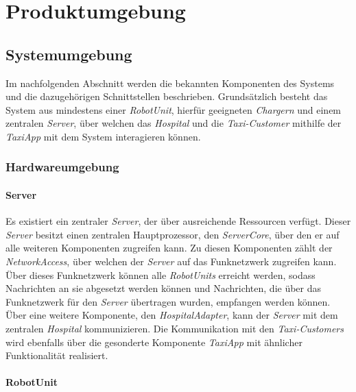 \section{Produktumgebung}

  \subsection{Systemumgebung}
  Im nachfolgenden Abschnitt werden die bekannten Komponenten des Systems und die dazugehörigen Schnittstellen beschrieben.
  Grundsätzlich besteht das System aus mindestens einer \emph{RobotUnit}, hierfür geeigneten \emph{Chargern} und einem zentralen \emph{Server}, über welchen das \emph{Hospital} und die \emph{Taxi-Customer} mithilfe der \emph{TaxiApp} mit dem System interagieren können.

  \subsubsection{Hardwareumgebung}

    \paragraph{Server}\label{server}

    Es existiert ein zentraler \emph{Server}, der über ausreichende Ressourcen verfügt.
    Dieser \emph{Server} besitzt einen zentralen Hauptprozessor, den \emph{ServerCore}, über den er auf alle weiteren Komponenten zugreifen kann.
    Zu diesen Komponenten zählt der \emph{NetworkAccess}, über welchen der \emph{Server} auf das Funknetzwerk zugreifen kann.
    Über dieses Funknetzwerk können alle \emph{RobotUnits} erreicht werden, sodass Nachrichten an sie abgesetzt werden können und Nachrichten, die über das Funknetzwerk für den \emph{Server} übertragen wurden, empfangen werden können.
    Über eine weitere Komponente, den \emph{HospitalAdapter}, kann der \emph{Server} mit dem zentralen \emph{Hospital} kommunizieren.
    Die Kommunikation mit den \emph{Taxi-Customers} wird ebenfalls über die gesonderte Komponente \emph{TaxiApp} mit ähnlicher Funktionalität realisiert.

    \paragraph{RobotUnit}\label{robotunit}

